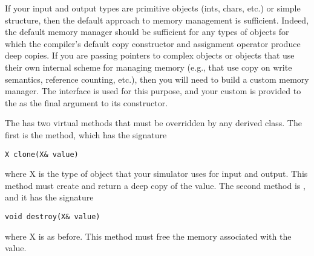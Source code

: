 If your input and output types are primitive objects (ints, chars, etc.) or simple structure, then the default approach to memory management is sufficient. Indeed, the default memory manager should be sufficient for any types of objects for which the compiler's default copy constructor and assignment operator produce deep copies. If you are passing pointers to complex objects or objects that use their own internal scheme for managing memory (e.g., that use copy on write semantics, reference counting, etc.), then you will need to build a custom memory manager. The  interface is used for this purpose, and your custom  is provided to the  as the final argument to its constructor.

The  has two virtual methods that must be overridden by any derived class. The first is the  method, which has the signature
\begin{verbatim}
X clone(X& value)
\end{verbatim}
where X is the type of object that your simulator uses for input and output. This method must create and return a deep copy of the value. The second method is , and it has the signature
\begin{verbatim}
void destroy(X& value)
\end{verbatim}
where X is as before. This method must free the memory associated with the value. 

